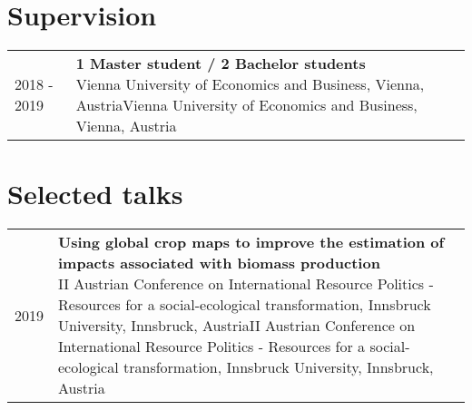 \documentclass[10pt,a4paper,]{article}
\makeatletter
\def\detaileditem#1#2#3#4#5{
#2 & \parbox[t]{0.85\textwidth}{%
      \textbf{#1}\hfill{\footnotesize #3}\\
      \ifx#4\empty\else#4\par\fi%
      \ifx#5\empty\else{%
        \vspace{0.1cm}\begin{minipage}{0.7\textwidth}%
        \begin{itemize}#5\end{itemize}%
        \end{minipage}}\fi%
      \vspace{\parsep}}\\}
\def\detailedsection#1{\begin{longtable}{@{\extracolsep{\fill}}ll}#1\end{longtable}}
\makeatother
\begin{document}
\hypertarget{supervision}{%
\section{Supervision}\label{supervision}}

\detailedsection{\detaileditem{1 Master student / 2 Bachelor students}{2018 - 2019}{}{Vienna University of Economics and Business, Vienna, Austria}{\empty}\detaileditem{1 Master student}{2017 - 2018}{}{University of Applied Sciences Wiener Neustadt, Wiener Neustadt-Niederösterreich, Austria}{\empty}\detaileditem{2 PhD students in the Young Scientist Summer Program (YSSP)}{2017 - 2017}{}{International Institute for Applied Systems Analysis, Laxenburg-Niederösterreich, Austria}{\empty}}

\hypertarget{selected-talks}{%
\section{Selected talks}\label{selected-talks}}

\detailedsection{\detaileditem{Using global crop maps to improve the estimation of impacts associated with biomass production}{2019}{}{II Austrian Conference on International Resource Politics - Resources for a social-ecological transformation, Innsbruck University, Innsbruck, Austria}{\empty}\detaileditem{dtwSat: An R Package for Land Cover Classification Using Satellite Image Time Series}{2017}{}{Open Science Conference 2017, European Space Agency (ESA) Centre for Earth Observation (ESRIN), Frascati, Italy}{\empty}\detaileditem{Big Earth observation data analytics for land use and land cover change in the Brazilian Amazon}{2016}{}{Doctoral program in interdisciplinary environmental sciences (DENVI) Annual Meeting, University of Helsinki, Helsinki, Finland}{\empty}\detaileditem{Big Earth Observation Data Analytics: Matching Requirements to System Architectures}{2016}{}{Lecture at the Linköping University, Linköping University, Linköping, Sweden}{\empty}\detaileditem{Time-Weighted Dynamic Time Warping for satellite image time series analysis}{2016}{}{Lecture at the Humboldt University of Berlin, Humboldt University of Berlin, Berlin, Germany}{\empty}\detaileditem{Large-scale agricultural mapping using big earth observation data}{2016}{}{Brazil-Sweden Excellence Seminar, Coordination for the Improvement of Higher Education Personnel (CAPES), Brasília, Brazil}{\empty}\detaileditem{Land use mapping in the Brazilian Amazon with remote sensing time series}{2015}{}{35th EARSeL Symposium and 2nd EARSeL International Workshop on Temporal Analysis of Satellite Images, KTH Royal Institute of Technology, Stockholm, Sweden}{\empty}}
\end{document}
